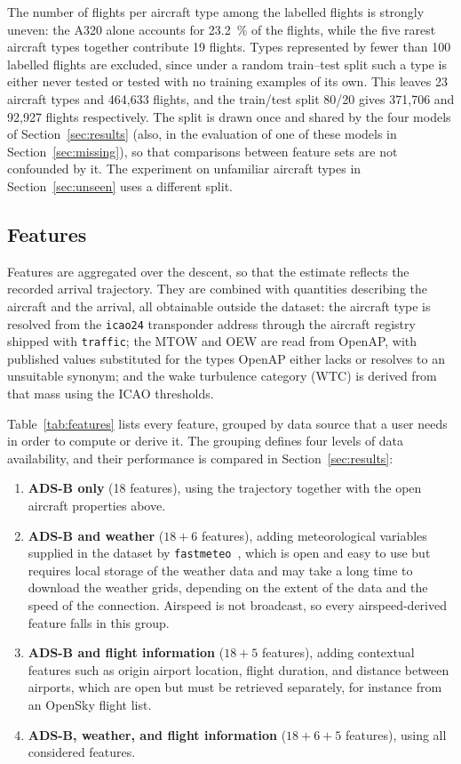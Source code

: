 \documentclass[
  manuscript=proceedings,  %
  layout=preprint,  %
  year=2026,
  volume=x,
]{extra/joas}
\begin{document}
The number of flights per aircraft type among the labelled flights is strongly uneven: the A320 alone accounts for 23.2~\% of the flights, while the five rarest aircraft types together contribute 19 flights. Types represented by fewer than 100 labelled flights are excluded, since under a random train--test split such a type is either never tested or tested with no training examples of its own. This leaves 23 aircraft types and 464{,}633 flights, and the train/test split 80/20 gives 371{,}706 and 92{,}927 flights respectively. The split is drawn once and shared by the four models of Section~\ref{sec:results} (also, in the evaluation of one of these models in Section~\ref{sec:missing}), so that comparisons between feature sets are not confounded by it. The experiment on unfamiliar aircraft types in Section~\ref{sec:unseen} uses a different split.

\subsection{Features}
\label{sec:features}

Features are aggregated over the descent, so that the estimate reflects the recorded arrival trajectory. They are combined with quantities describing the aircraft and the arrival, all obtainable outside the dataset: the aircraft type is resolved from the \texttt{icao24} transponder address through the aircraft registry shipped with \texttt{traffic}; the MTOW and OEW are read from OpenAP, with published values substituted for the types OpenAP either lacks or resolves to an unsuitable synonym; and the wake turbulence category (WTC) is derived from that mass using the ICAO thresholds.


Table~\ref{tab:features} lists every feature, grouped by data source that a user needs in order to compute or derive it. The grouping defines four levels of data availability, and their performance is compared in Section~\ref{sec:results}:

\begin{enumerate}
  \item \textbf{ADS-B only} (18 features), using the trajectory together with the open aircraft properties above.
  \item \textbf{ADS-B and weather} ($18+6$ features), adding meteorological variables supplied in the dataset by \texttt{fastmeteo}~\cite{fastmeteo}, which is open and easy to use but requires local storage of the weather data and may take a long time to download the weather grids, depending on the extent of the data and the speed of the connection. Airspeed is not broadcast, so every airspeed-derived feature falls in this group.
  \item \textbf{ADS-B and flight information} ($18+5$ features), adding contextual features such as origin airport location, flight duration, and distance between airports, which are open but must be retrieved separately, for instance from an OpenSky flight list.
  \item \textbf{ADS-B, weather, and flight information} ($18+6+5$ features), using all considered features.
\end{enumerate}
\end{document}
